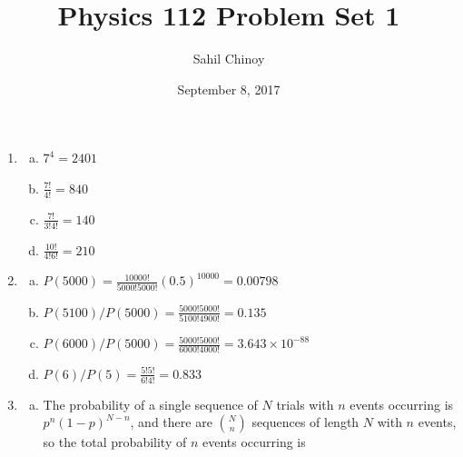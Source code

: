 \documentclass{article}
\title{Physics 112 Problem Set 1}
\author{Sahil Chinoy}
\date{September 8, 2017}
\begin{document}
\maketitle{}

\begin{enumerate}

\item

	\begin{enumerate}[(a)]

	\item

	$7^4 = 2401$

	\item

	$\frac{7!}{4!} = 840$

	\item

	$\frac{7!}{3!4!} = 140$

	\item

	$\frac{10!}{4!6!} = 210$

	\end{enumerate}

\item

	\begin{enumerate}[(a)]

	\item

	$P(5000) = \frac{10000!}{5000!5000!}(0.5)^{10000} = 0.00798$

	\item

	$P(5100)/P(5000) = \frac{5000!5000!}{5100!4900!} = 0.135$

	\item

	$P(6000)/P(5000) = \frac{5000!5000!}{6000!4000!} = 3.643 \times 10^{-88}$

	\item

	$P(6)/P(5) = \frac{5!5!}{6!4!} = 0.833$

	\end{enumerate}

\item

	\begin{enumerate}[(a)]

	\item

	The probability of a single sequence of $N$ trials with $n$ events occurring is $p^n(1-p)^{N-n}$, and there are ${N \choose n}$ sequences of length $N$ with $n$ events, so the total probability of $n$ events occurring is


\end{enumerate}
\end{enumerate}
\end{document}

